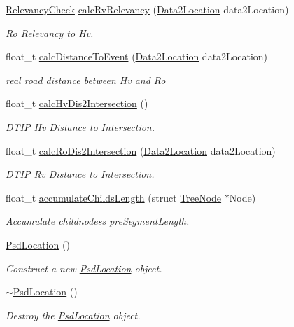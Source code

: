 \begin{DoxyCompactItemize}
\hyperlink{_psd_location_8h_ad3abb902810ad80bbc508a024f5af264}{Relevancy\+Check} \hyperlink{class_psd_location_a9f1a98a1ba23af93df973502332cf10f}{calc\+Rv\+Relevancy} (\hyperlink{_psd_location_8h_a1e3a92020005d2a81aa50ba5ae9b129c}{Data2\+Location} data2\+Location)
\begin{DoxyCompactList}\small\item\em Ro Relevancy to Hv. \end{DoxyCompactList}\item 
float\+\_\+t \hyperlink{class_psd_location_a8b78f66d995b0d621ddb4ed760e1e6a7}{calc\+Distance\+To\+Event} (\hyperlink{_psd_location_8h_a1e3a92020005d2a81aa50ba5ae9b129c}{Data2\+Location} data2\+Location)
\begin{DoxyCompactList}\small\item\em real road distance between Hv and Ro \end{DoxyCompactList}\item 
float\+\_\+t \hyperlink{class_psd_location_a3e8f14fdfe1e6d1495902d265ad6ea93}{calc\+Hv\+Dis2\+Intersection} ()
\begin{DoxyCompactList}\small\item\em D\+T\+IP Hv Distance to Intersection. \end{DoxyCompactList}\item 
float\+\_\+t \hyperlink{class_psd_location_ae9cfb75671bc47a49d167ff8d7d5093c}{calc\+Ro\+Dis2\+Intersection} (\hyperlink{_psd_location_8h_a1e3a92020005d2a81aa50ba5ae9b129c}{Data2\+Location} data2\+Location)
\begin{DoxyCompactList}\small\item\em D\+T\+IP Rv Distance to Intersection. \end{DoxyCompactList}\item 
float\+\_\+t \hyperlink{class_psd_location_a672da471bdc922005cfe26bfaa4315f8}{accumulate\+Childs\+Length} (struct \hyperlink{struct_tree_node}{Tree\+Node} $\ast$Node)
\begin{DoxyCompactList}\small\item\em Accumulate childnodes\textquotesingle{}s pre\+Segment\+Length. \end{DoxyCompactList}\item 
\hyperlink{class_psd_location_a6d89a3bd03a7fe9af26fc08d446bfd24}{Psd\+Location} ()
\begin{DoxyCompactList}\small\item\em Construct a new \hyperlink{class_psd_location}{Psd\+Location} object. \end{DoxyCompactList}\item 
\hyperlink{class_psd_location_ad8df0c3ca51c9df077060c1f8209d977}{$\sim$\+Psd\+Location} ()
\begin{DoxyCompactList}\small\item\em Destroy the \hyperlink{class_psd_location}{Psd\+Location} object. \end{DoxyCompactList}\end{DoxyCompactItemize}
